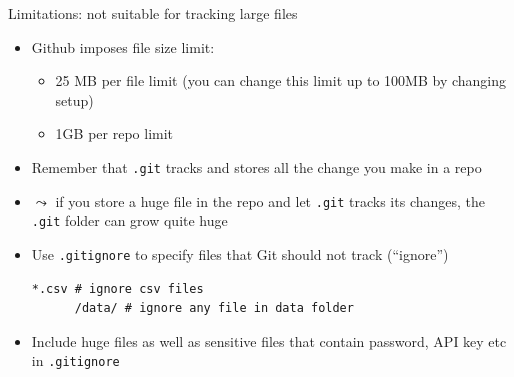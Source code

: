 \documentclass[handout,pdftex,10pt,aspectratio=169]{beamer}
\begin{document}
\begin{frame}[fragile]{Limitations: not suitable for tracking large files}
  \begin{itemize}[<+->]
    \item Github imposes file size limit:
    \begin{itemize}
      \item 25 MB per file limit 
      (you can change this limit up to 100MB by changing setup)
      \item 1GB per repo limit
    \end{itemize}
    \item Remember that \texttt{.git} tracks and stores all the change you make in a repo
    \item[] $\leadsto$ if you store a huge file in the repo and let \texttt{.git} tracks 
    its changes, the \texttt{.git} folder can grow quite huge
    \medskip
    \item Use \texttt{.gitignore} to specify files that Git should not track (``ignore'')
    \begin{Verbatim}[frame=single, label=.gitignore]
      *.csv # ignore csv files
      /data/ # ignore any file in data folder
    \end{Verbatim}
    \item Include huge files as well as sensitive files that contain password, API key etc in \texttt{.gitignore}
  \end{itemize}
\end{frame}
\end{document}
